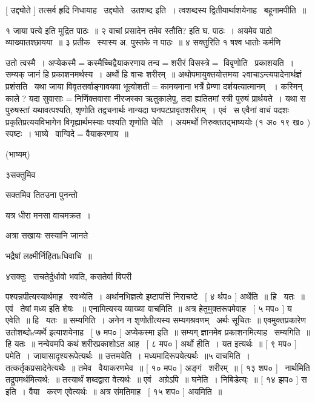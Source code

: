 \documentclass[11pt, openany]{book}
\begin{document}
 [ उद्द्योते ] तत्सर्व हृदि निधायाह \textendash\ उद्द्योते \textendash\ उतशब्द इति~। 
त्वशब्दस्य द्वितीयार्थाशयेनाह \textendash\ बहूनामपीति~॥



१ जाया पत्ये इति मुद्रित पाठः~॥ २ वाचां प्रसादेन तमेव स्तौति? इति घ.
पाठः~। अयमेव पाठो व्याख्यातश्छायया~॥ ३ प्रतीक \textendash\ स्यास्य अ. पुस्तके न
पाठः~॥ ४ सक्तुरिति १ षश्व धातोः कर्मणि 





उतो त्वस्मै~। अप्येकस्मै$=$कस्मैच्चिद्वैयाकरणाय तन्व$=$शरीरं विसस्त्रे$=$
विवृणोति \textendash\ प्रकाशयति~। सम्यक् जानं हि प्रकाशनमर्थस्य~। अर्थो हि वाचः
शरीरम्~॥ अथोपमायुक्तयोत्तमया २वाचाऽन्त्यपादेनार्थज्ञं प्रशंसति \textendash\ यथा जाया
विवृतसर्वाङ्गावयवा भूत्वोशती$=$कामयमाना भर्त्रे प्रेम्णा दर्शयत्यात्मानम्
~। कस्मिन् काले ? यदा सुवासाः$=$निर्णिक्तवासा नीरजस्का ऋतुकालेपु, तदा
ह्यतितमां स्त्री पुरुषं प्रार्थयते~। यथा स पुरुषस्तां यथावत्पश्यति,
शृणोति तद्वचनार्थः नान्यदा घनपटप्रावृतशरीराम्~। एवं \textendash\ स एवैनां वाचं पदशः
प्रकृतिप्रत्ययविभागेन विगृह्यार्थमस्याः पश्यति शृणोति चेति~। अयमर्थो
निरुक्ततद्भाष्ययोः (१ अ० १९ ख० ) स्पष्टः~। भाष्ये \textendash\ वाग्विदे$=$वैयाकरणाय~॥


 (भाष्यम्) 

३सक्तुमिव \textendash\ 

सक्तमिव तितउना पुनन्तो 

यत्र धीरा मनसा वाचमक्रत~। 

अत्रा सखायः सस्यानि जानते 

भद्रैषां लक्ष्मीर्निहिताsधिवाचि~॥ 

४सक्तुः \textendash\ सचतेर्दुर्धावो भवति, कसतेर्वा विपरी \textendash\ 



पश्यन्नपीत्यस्यार्थमाह़ \textendash\ स्वभ्येति~। अर्थानभिज्ञत्वे इष्टापत्तिं
निराचष्टे \textendash\ [ ४ र्थप० ] अर्थेति~॥ हि \textendash\ यतः~॥ एवं \textendash\ तेषां मध्य इति शेषः
~॥ एनामित्यस्य व्याख्या वाचमिति~॥ अत्र हेतुमुक्तरूपमेवाह \textendash\ [ ५ मप० ]
य एवेति~॥ हि \textendash\ यतः~॥ सम्यगिति~। अनेन न शृणोतीत्यस्य सम्यगश्रवणम् \textendash\ अर्थः
सूचितः~॥ एवमुक्तप्रकारेण उतोशब्दोsप्यर्थे इत्याशयेनाह \textendash\ [ ७ मप० ]
अप्येकस्मा इति~॥ सम्यग् ज्ञानमेव प्रकाशनमित्याह \textendash\ सम्यगिति~॥ हि यतः~॥
नन्वेवमपि कथं शरीरप्रकाशोऽत आह \textendash\ [ ८ मप० ] अर्थो हीति~। यत
इत्यर्थः~॥ [ ९ मप० ] पमेति~। जायासादृश्यरूपेत्यर्थः~॥ उत्तमयेति~। 
मध्यमादिरूपयेत्यर्थः~॥५ वाचमिति~। तत्कर्तृकप्रसादेनेत्यथैः~॥
तमेव \textendash\ वैयाकरणमेव~॥ [ १० मप० ] अङ्गं \textendash\ शरीरम्~॥ [ १३ शप० ] \textendash\ 
नार्थमिति तद्रूपमर्थमित्यर्थ:~॥ तस्यार्थं शब्दद्वारा वेत्यर्थः~॥ एवं \textendash\ 
अग्रेऽपि~॥ घनेति~। निबिडेत्य्ः~॥ [ १४ झप० ] स इति~। वैया \textendash\ करण
ए्वेत्यर्थः~॥ अत्र संमतिमाह \textendash\ [ १५ शप० ] अयमिति~॥ 
\end{document}
